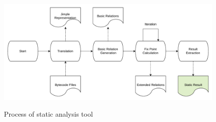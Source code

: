 \documentclass{fac}
\begin{document}
\begin{figure}
\centering
\includegraphics[width=16cm,height=6cm]{static-process.pdf}
\caption{Process of static analysis tool}
\label{fig:static-process}
\end{figure}
\end{document}
